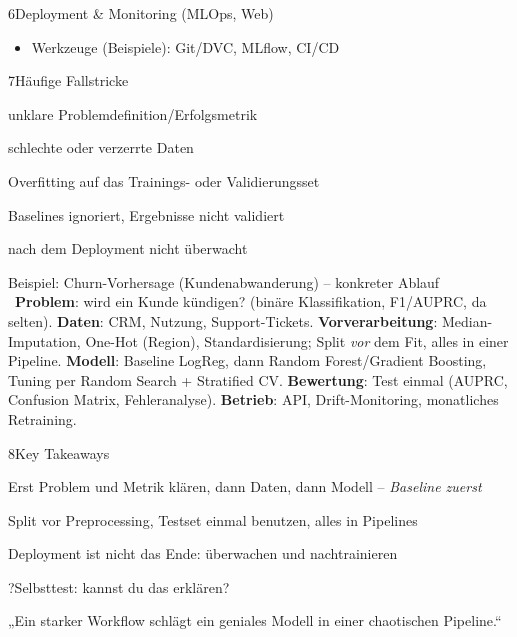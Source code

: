 \begin{hngrid}
\begin{hnp}[raster multicolumn=3,acc=hnteal]{6}{Deployment \& Monitoring (MLOps, Web)}
\begin{itemize}
\item Werkzeuge (Beispiele): Git/DVC, MLflow, CI/CD
\end{itemize}
\end{hnp}
%
\begin{hnp}[raster multicolumn=3,acc=hnrose]{7}{Häufige Fallstricke}
\begin{hncon}
\item unklare Problemdefinition/Erfolgsmetrik
\item schlechte oder verzerrte Daten
\item Overfitting auf das Trainings- oder Validierungsset
\item Baselines ignoriert, Ergebnisse nicht validiert
\item nach dem Deployment nicht überwacht
\end{hncon}
\end{hnp}
%
\begin{hnex}[raster multicolumn=6]{Beispiel: Churn-Vorhersage (Kundenabwanderung) -- konkreter Ablauf}
\hnsol\ \textbf{Problem}: wird ein Kunde kündigen? (binäre Klassifikation, F1/AUPRC, da selten). \textbf{Daten}: CRM, Nutzung, Support-Tickets. \textbf{Vorverarbeitung}: Median-Imputation, One-Hot (Region), Standardisierung; Split \emph{vor} dem Fit, alles in einer Pipeline. \textbf{Modell}: Baseline LogReg, dann Random Forest/Gradient Boosting, Tuning per Random Search + Stratified CV. \textbf{Bewertung}: Test einmal (AUPRC, Confusion Matrix, Fehleranalyse). \textbf{Betrieb}: API, Drift-Monitoring, monatliches Retraining.
\end{hnex}
%
\begin{hnp}[raster multicolumn=6,acc=hnorange]{8}{Key Takeaways}
\begin{hnchk}
\item Erst Problem und Metrik klären, dann Daten, dann Modell -- \emph{Baseline zuerst}
\item Split vor Preprocessing, Testset einmal benutzen, alles in Pipelines
\item Deployment ist nicht das Ende: überwachen und nachtrainieren
\end{hnchk}
\end{hnp}
%
\begin{hnp}[raster multicolumn=6,acc=hnpurple,colback=hnlilac!30]{?}{Selbsttest: kannst du das erklären?}
\end{hnp}
%
\begin{hnbanner}[raster multicolumn=6]
„Ein starker Workflow schlägt ein geniales Modell in einer chaotischen Pipeline.“
\end{hnbanner}
\end{hngrid}
